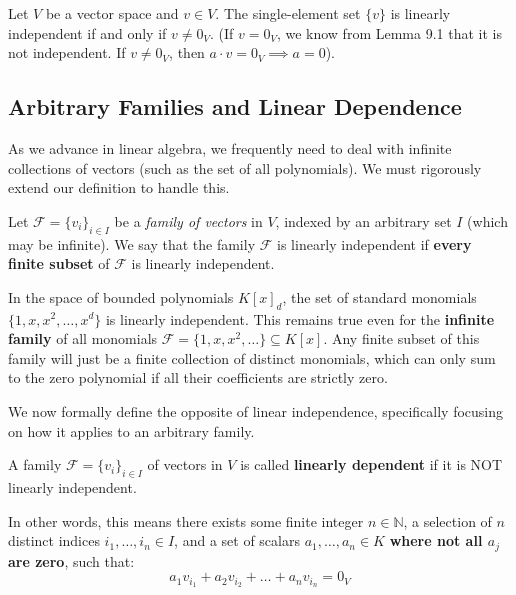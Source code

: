 \begin{example}
Let $V$ be a vector space and $v \in V$. The single-element set $\{v\}$ is linearly independent if and only if $v \ne 0_V$. (If $v = 0_V$, we know from Lemma 9.1 that it is not independent. If $v \ne 0_V$, then $a \cdot v = 0_V \implies a = 0$).
\end{example}

\subsection{Arbitrary Families and Linear Dependence}

As we advance in linear algebra, we frequently need to deal with infinite collections of vectors (such as the set of all polynomials). We must rigorously extend our definition to handle this.

\begin{definition}
Let $\mathcal{F} = \{v_i\}_{i \in I}$ be a \textit{family of vectors} in $V$, indexed by an arbitrary set $I$ (which may be infinite). We say that the family $\mathcal{F}$ is linearly independent if \textbf{every finite subset} of $\mathcal{F}$ is linearly independent.
\end{definition}

\begin{example}
In the space of bounded polynomials $K[x]_d$, the set of standard monomials $\{1, x, x^2, \dots, x^d\}$ is linearly independent. This remains true even for the \textbf{infinite family} of all monomials $\mathcal{F} = \{1, x, x^2, \dots\} \subseteq K[x]$. Any finite subset of this family will just be a finite collection of distinct monomials, which can only sum to the zero polynomial if all their coefficients are strictly zero.
\end{example}

We now formally define the opposite of linear independence, specifically focusing on how it applies to an arbitrary family.

\begin{definition}
A family $\mathcal{F} = \{v_i\}_{i \in I}$ of vectors in $V$ is called \textbf{linearly dependent} if it is NOT linearly independent. 

In other words, this means there exists some finite integer $n \in \mathbb{N}$, a selection of $n$ distinct indices $i_1, \dots, i_n \in I$, and a set of scalars $a_1, \dots, a_n \in K$ \textbf{where not all $a_j$ are zero}, such that:
\[
a_1 v_{i_1} + a_2 v_{i_2} + \dots + a_n v_{i_n} = 0_V
\]
\end{definition}

